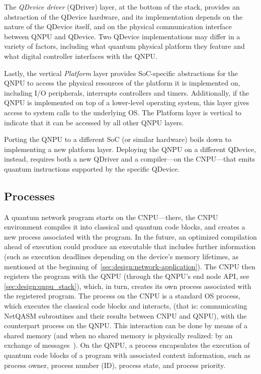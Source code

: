 The \emph{\ac{QDevice} driver} (\ac{QDriver}) layer, at the bottom of the stack, provides an abstraction of the \ac{QDevice} hardware, and its implementation depends on the nature of the \ac{QDevice} itself, and on the physical communication interface between \ac{QNPU} and \ac{QDevice}. Two \ac{QDevice} implementations may differ in a variety of factors, including what quantum physical platform they feature and what digital controller interfaces with the \ac{QNPU}.

Lastly, the vertical \emph{Platform} layer provides \ac{SoC}-specific abstractions for the \ac{QNPU} to access the physical resources of the platform it is implemented on, including I/O peripherals, interrupts controllers and timers. Additionally, if the \ac{QNPU} is implemented on top of a lower-level operating system, this layer gives access to system calls to the underlying \ac{OS}. The Platform layer is vertical to indicate that it can be accessed by all other \ac{QNPU} layers.

Porting the \ac{QNPU} to a different \ac{SoC} (or similar hardware) boils down to implementing a new platform layer. Deploying the \ac{QNPU} on a different \ac{QDevice}, instead, requires both a new \ac{QDriver} and a compiler---on the \ac{CNPU}---that emits quantum instructions supported by the specific \ac{QDevice}.

\subsection{Processes}
\label{sec:design:processes}

A quantum network program starts on the \ac{CNPU}---there, the \ac{CNPU} environment compiles it into classical and quantum code blocks, and creates a new process associated with the program. In the future, an optimized compilation ahead of execution could produce an executable that includes further information (such as execution deadlines depending on the device's memory lifetimes, as mentioned at the beginning of~\cref{sec:design:network-application}). The \ac{CNPU} then registers the program with the \ac{QNPU} (through the \ac{QNPU}'s end node \ac{API}, see \cref{sec:design:qnpu_stack}), which, in turn, creates its own process associated with the registered program. The process on the \ac{CNPU} is a standard \ac{OS} process, which executes the classical code blocks and interacts, (that is: communicating NetQASM subroutines and their results between \ac{CNPU} and \ac{QNPU}), with the counterpart process on the \ac{QNPU}. This interaction can be done by means of a shared memory (and when no shared memory is physically realized: by an exchange of messages~\cite{dahlberg_2022_netqasm}). On the \ac{QNPU}, a process encapsulates the execution of quantum code blocks of a program with associated context information, such as process owner, process number (ID), process state, and process priority.

